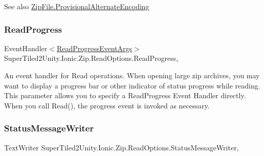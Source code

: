 \begin{DoxySeeAlso}{See also}
\mbox{\hyperlink{class_super_tiled2_unity_1_1_ionic_1_1_zip_1_1_zip_file_aece3d00ca721d3d06020ecc44442ea1e}{Zip\+File.\+Provisional\+Alternate\+Encoding}}


\end{DoxySeeAlso}
\mbox{\label{class_super_tiled2_unity_1_1_ionic_1_1_zip_1_1_read_options_ab4dc78c65a53e852df3fcdc5232383de}} 
\subsubsection{\texorpdfstring{Read\+Progress}{ReadProgress}}
{\footnotesize\ttfamily Event\+Handler$<$\mbox{\hyperlink{class_super_tiled2_unity_1_1_ionic_1_1_zip_1_1_read_progress_event_args}{Read\+Progress\+Event\+Args}}$>$ Super\+Tiled2\+Unity.\+Ionic.\+Zip.\+Read\+Options.\+Read\+Progress\hspace{0.3cm}{\ttfamily [get]}, {\ttfamily [set]}}



An event handler for Read operations. When opening large zip archives, you may want to display a progress bar or other indicator of status progress while reading. This parameter allows you to specify a Read\+Progress Event Handler directly. When you call {\ttfamily Read()}, the progress event is invoked as necessary. 

\mbox{\label{class_super_tiled2_unity_1_1_ionic_1_1_zip_1_1_read_options_afbdb75da8e78c61f663cf0a623e0e4cf}} 
\subsubsection{\texorpdfstring{Status\+Message\+Writer}{StatusMessageWriter}}
{\footnotesize\ttfamily Text\+Writer Super\+Tiled2\+Unity.\+Ionic.\+Zip.\+Read\+Options.\+Status\+Message\+Writer\hspace{0.3cm}{\ttfamily [get]}, {\ttfamily [set]}}



